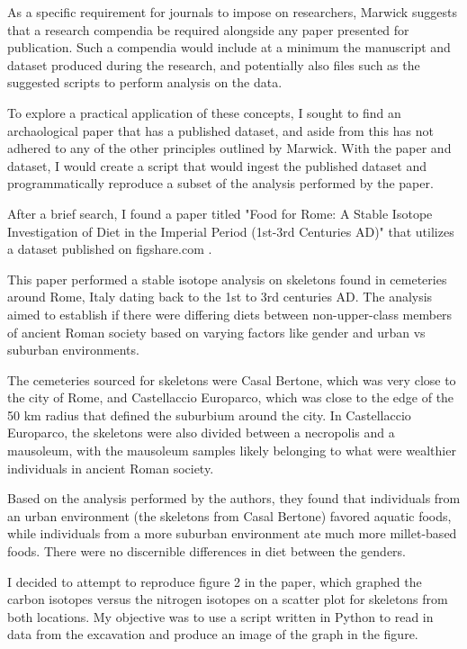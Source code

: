 \documentclass[12pt]{article}
\begin{document}
As a specific requirement for journals to impose on researchers, Marwick
suggests that a research compendia be required alongside any paper presented
for publication. Such a compendia would include at a minimum the manuscript and
dataset produced during the research, and potentially also files such as the
suggested scripts to perform analysis on the data.

To explore a practical application of these concepts, I sought to find an
archaological paper that has a published dataset, and aside from this has not
adhered to any of the other principles outlined by Marwick. With the paper and
dataset, I would create a script that would ingest the published dataset and
programmatically reproduce a subset of the analysis performed by the paper.

After a brief search, I found a paper titled "Food for Rome: A Stable Isotope
Investigation of Diet in the Imperial Period (1st-3rd Centuries AD)" that
utilizes a dataset published on figshare.com \cite{killgrove13}.

This paper performed a stable isotope analysis on skeletons found in cemeteries
around Rome, Italy dating back to the 1st to 3rd centuries AD. The analysis
aimed to establish if there were differing diets between non-upper-class
members of ancient Roman society based on varying factors like gender and urban
vs suburban environments.

The cemeteries sourced for skeletons were Casal Bertone, which was very close
to the city of Rome, and Castellaccio Europarco, which was close to the edge of
the 50 km radius that defined the suburbium around the city. In Castellaccio
Europarco, the skeletons were also divided between a necropolis and a
mausoleum, with the mausoleum samples likely belonging to what were wealthier
individuals in ancient Roman society.

Based on the analysis performed by the authors, they found that individuals
from an urban environment (the skeletons from Casal Bertone) favored aquatic
foods, while individuals from a more suburban environment ate much more
millet-based foods. There were no discernible differences in diet between the
genders.

I decided to attempt to reproduce figure 2 in the paper, which graphed the
carbon isotopes versus the nitrogen isotopes on a scatter plot for skeletons
from both locations. My objective was to use a script written in Python to read
in data from the excavation and produce an image of the graph in the figure.
\end{document}
